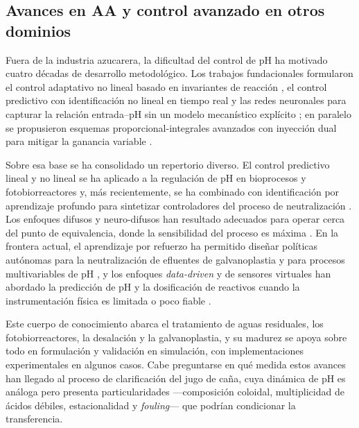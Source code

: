 \subsection{Avances en AA y control avanzado en otros dominios}
\label{sub:otros_dominios}

Fuera de la industria azucarera, la dificultad del control de pH ha
motivado cuatro décadas de desarrollo metodológico. Los trabajos
fundacionales formularon el control adaptativo no lineal basado en
invariantes de reacción \parencite{henson1994adaptive}, el control
predictivo con identificación no lineal en tiempo real
\parencite{proll1994modelpredictive} y las redes neuronales para capturar
la relación entrada--pH sin un modelo mecanístico explícito
\parencite{palancar1998phcontrol}; en paralelo se propusieron esquemas
proporcional-integrales avanzados con inyección dual para mitigar la
ganancia variable \parencite{hurowitz2000control}.

Sobre esa base se ha consolidado un repertorio diverso. El control
predictivo lineal y no lineal se ha aplicado a la regulación de pH en
bioprocesos y fotobiorreactores
\parencite{berenguel2004model,otalora2026enhancing} y, más
recientemente, se ha combinado con identificación por aprendizaje
profundo para sintetizar controladores del proceso de neutralización
\parencite{durairaj2023deep}. Los enfoques difusos y neuro-difusos han
resultado adecuados para operar cerca del punto de equivalencia, donde la
sensibilidad del proceso es máxima
\parencite{herediamolinero2014feedback,suguna2026advanced}. En la frontera
actual, el aprendizaje por refuerzo ha permitido diseñar políticas
autónomas para la neutralización de efluentes de galvanoplastia y para
procesos multivariables de pH
\parencite{alvesgoulart2020autonomous,panjapornpon2022reinforcement}, y
los enfoques \textit{data-driven} y de sensores virtuales han abordado la
predicción de pH y la dosificación de reactivos cuando la
instrumentación física es limitada o poco fiable
\parencite{son2021deep,xu2022datadriven,bardeeniz2025artificial}.

Este cuerpo de conocimiento abarca el tratamiento de aguas residuales, los
fotobiorreactores, la desalación y la galvanoplastia, y su madurez se
apoya sobre todo en formulación y validación en simulación, con
implementaciones experimentales en algunos casos. Cabe preguntarse en
qué medida estos avances han llegado al proceso de clarificación del
jugo de caña, cuya dinámica de pH es análoga pero presenta
particularidades ---composición coloidal, multiplicidad de ácidos débiles,
estacionalidad y \textit{fouling}--- que podrían condicionar la
transferencia.

